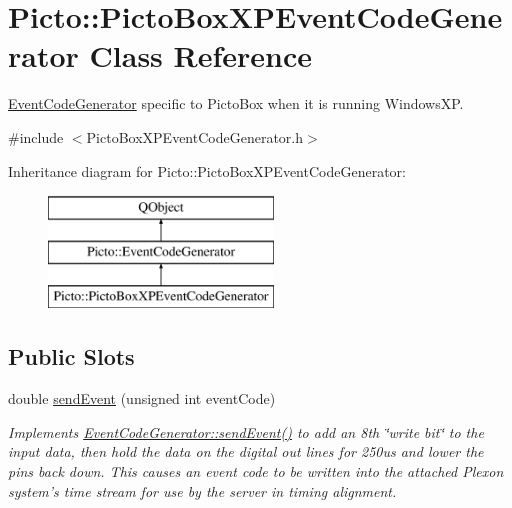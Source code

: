 \hypertarget{class_picto_1_1_picto_box_x_p_event_code_generator}{\section{Picto\-:\-:Picto\-Box\-X\-P\-Event\-Code\-Generator Class Reference}
\label{class_picto_1_1_picto_box_x_p_event_code_generator}
}


\hyperlink{class_picto_1_1_event_code_generator}{Event\-Code\-Generator} specific to Picto\-Box when it is running Windows\-X\-P.  




{\ttfamily \#include $<$Picto\-Box\-X\-P\-Event\-Code\-Generator.\-h$>$}

Inheritance diagram for Picto\-:\-:Picto\-Box\-X\-P\-Event\-Code\-Generator\-:\begin{figure}[H]
\begin{center}
\leavevmode
\includegraphics[height=3.000000cm]{class_picto_1_1_picto_box_x_p_event_code_generator}
\end{center}
\end{figure}
\subsection*{Public Slots}
\begin{DoxyCompactItemize}
\item 
\hypertarget{class_picto_1_1_picto_box_x_p_event_code_generator_ab55544f42ba7b59f6efb95fdb204e355}{double \hyperlink{class_picto_1_1_picto_box_x_p_event_code_generator_ab55544f42ba7b59f6efb95fdb204e355}{send\-Event} (unsigned int event\-Code)}\label{class_picto_1_1_picto_box_x_p_event_code_generator_ab55544f42ba7b59f6efb95fdb204e355}

\begin{DoxyCompactList}\small\item\em Implements \hyperlink{class_picto_1_1_event_code_generator_adf6a7d68b44bcecec9b7093c723cebb9}{Event\-Code\-Generator\-::send\-Event()} to add an 8th \char`\"{}write bit\char`\"{} to the input data, then hold the data on the digital out lines for 250us and lower the pins back down. This causes an event code to be written into the attached Plexon system's time stream for use by the server in timing alignment. \end{DoxyCompactList}\end{DoxyCompactItemize}
